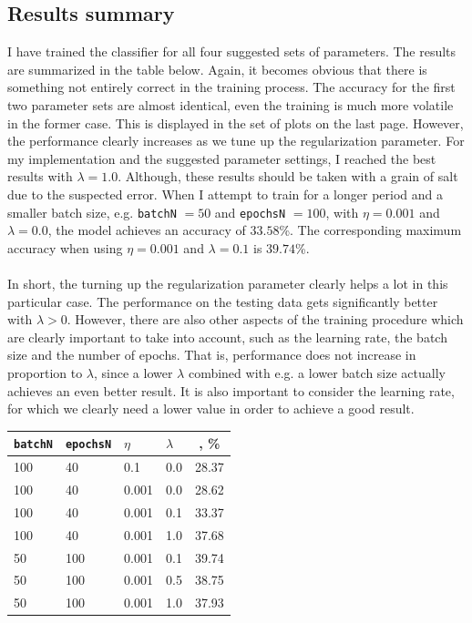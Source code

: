 \documentclass{article}
\begin{document}
\subsection*{Results summary}
	I have trained the classifier for all four suggested sets of parameters. The results are summarized in the table below. Again, it becomes obvious that there is something not entirely correct in the training process. The accuracy for the first two parameter sets are almost identical, even the training is much more volatile in the former case. This is displayed in the set of plots on the last page. However, the performance clearly increases as we tune up the regularization parameter. For my implementation and the suggested parameter settings, I reached the best results with $\lambda = 1.0$. Although, these results should be taken with a grain of salt due to the suspected error. When I attempt to train for a longer period and a smaller batch size, e.g. \texttt{batchN} $=50$ and \texttt{epochsN} $=100$, with $\eta=0.001$ and $\lambda=0.0$, the model achieves an accuracy of $33.58$\%. The corresponding maximum accuracy when using $\eta=0.001$ and $\lambda=0.1$ is $39.74$\%. \\\\
%
In short, the turning up the regularization parameter clearly helps a lot in this particular case. The performance on the testing data gets significantly better with $\lambda > 0$. However, there are also other aspects of the training procedure which are clearly important to take into account, such as the learning rate, the batch size and the number of epochs. That is, performance does not increase in proportion to $\lambda$, since a lower $\lambda$ combined with e.g. a lower batch size actually achieves an even better result. It is also important to consider the learning rate, for which we clearly need a lower value in order to achieve a good result.

	\begin{center}	
	\begin{tabular}{|l|l|l|l|c|}
		\hline
		\texttt{batchN} & \texttt{epochsN} & $\eta$ & $\lambda$ & \text{Accuracy}, \% \\ \hline
		100 & 40 & 0.1 & 0.0 & 28.37 \\
		100 & 40 & 0.001 & 0.0 & 28.62\\
		100 & 40 & 0.001 & 0.1 &  33.37\\
		100 & 40 & 0.001 & 1.0 & 37.68\\ 
		50 & 100 & 0.001 & 0.1 & 39.74\\
		50 & 100 & 0.001 & 0.5	 & 38.75\\
		50 & 100 & 0.001 & 1.0 & 37.93\\\hline
	\end{tabular}
	\end{center}
\end{document}
